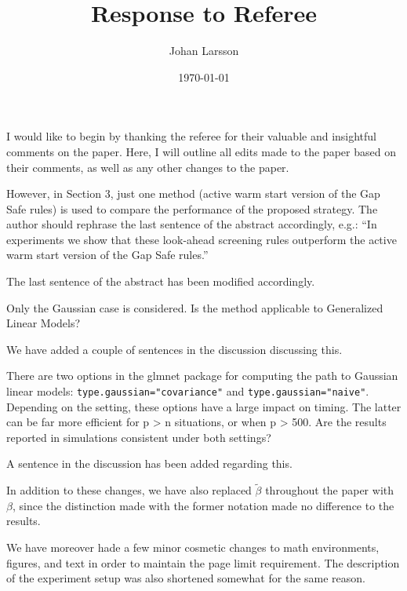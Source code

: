 \documentclass[english,a4paper]{article}
\title{Response to Referee}
\author{Johan Larsson}
\affil{The Department of Statistics, Lund University}
\date{\today}
\begin{document}
\maketitle

\noindent I would like to begin by thanking the referee for their valuable and insightful
comments on the paper. Here, I will outline all edits made to the paper based on
their comments, as well as any other changes to the paper.

\begin{displayquote}
  However, in Section 3, just one method (active warm start version of the Gap
  Safe rules) is used to compare the performance of the proposed strategy. The
  author should rephrase the last sentence of the abstract accordingly, e.g.:
  ``In experiments we show that these look-ahead screening rules outperform the
  active warm start version of the Gap Safe rules.''
\end{displayquote}
The last sentence of the abstract has been modified accordingly. 

\begin{displayquote}
  Only the Gaussian case is considered. Is the method applicable to Generalized
  Linear Models?
\end{displayquote}
We have added a couple of sentences in the discussion discussing this.

\begin{displayquote}
  There are two options in the glmnet package for computing the path to Gaussian
  linear models: \texttt{type.gaussian="covariance"} and \texttt{type.gaussian="naive"}.
  Depending on the setting, these options have a large impact on timing. The
  latter can be far more efficient for p > n situations, or when p > 500. Are
  the results reported in simulations consistent under both settings?
\end{displayquote}
A sentence in the discussion has been added regarding this.

In addition to these changes, we have also replaced \(\tilde\beta\)
throughout the paper with \(\beta\), since the distinction made with the former
notation made no difference to the results.
 
We have moreover hade a few minor cosmetic changes to math environments,
figures, and text in order to maintain the page limit requirement. The
description of the experiment setup was also shortened somewhat for the same
reason.
\end{document}
